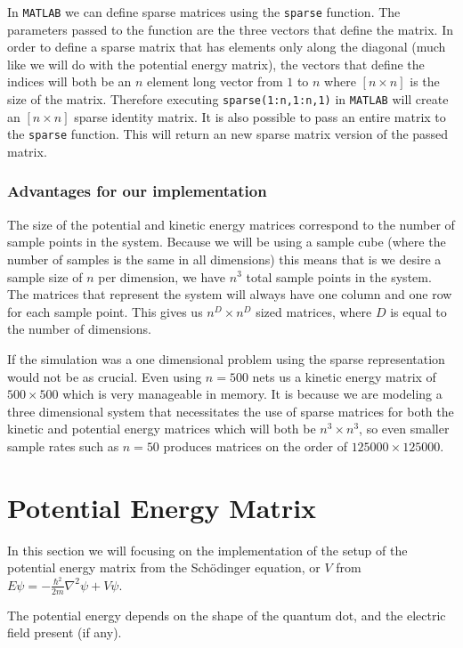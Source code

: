 \documentclass[authoryearcitations]{UoYCSproject}
\begin{document}
In \verb+MATLAB+ we can define sparse matrices using the \verb+sparse+ function. The parameters passed to the function
are the three vectors that define the matrix. 
In order to define a sparse matrix that has elements only along the diagonal (much like we will do with the potential
energy matrix), the vectors that define the indices will both be an $n$ element long vector from $1$ to $n$ where $[n \times n]$
is the size of the matrix. Therefore executing \verb+sparse(1:n,1:n,1)+ in \verb+MATLAB+ will create an $[n \times n]$ sparse
identity matrix. It is also possible to pass an entire matrix to the \verb+sparse+ function. This will return an new sparse
matrix version of the passed matrix. 

\subsubsection{Advantages for our implementation}
The size of the potential and kinetic energy matrices correspond to the number of sample points in the system. 
Because we will be using a sample cube (where the number of samples is the same in all dimensions) this means
that is we desire a sample size of $n$ per dimension, we have $n^3$ total sample points in the system. The 
matrices that represent the system will always have one column and one row for each sample point. This gives
us $n^D \times n^D$ sized matrices, where $D$ is equal to the number of dimensions. 

If the simulation was a one dimensional problem
using the sparse representation would not be as crucial. Even using $n = 500$ nets us a kinetic energy matrix of
$500 \times 500$ which is very manageable in memory. It is because we are modeling a three dimensional system that
necessitates the use of sparse matrices for both the kinetic and potential energy matrices which will both be
$n^3 \times n^3$, so even smaller sample rates such as $n = 50$ produces matrices on the order of $125000 \times 125000$.




\section{Potential Energy Matrix}
In this section we will focusing on the implementation of the setup of the potential energy matrix
from the Sch\"{o}dinger equation, or $V$ from $E\psi = -\frac{\hbar ^2}{2m}\nabla ^2\psi + V\psi $.

The potential energy depends on the shape of the quantum dot, and the electric field present (if any). 
\end{document}
